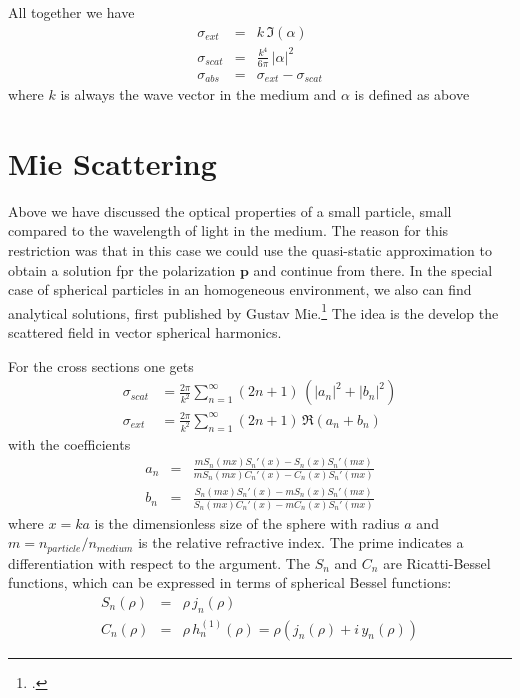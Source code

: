All together we have
\begin{eqnarray}
 \sigma_{ext} &= &  k \, \Im ( \alpha ) \\
 \sigma_{scat} & = &  \frac{k^4}{6 \pi }  \, |\alpha|^2 \\
 \sigma_{abs}  &=&  \sigma_{ext} - \sigma_{scat}
\end{eqnarray}
where $k$ is always the wave vector in the medium and $\alpha$ is defined as above

\section{Mie Scattering}

Above we have discussed the optical properties of a small particle, small compared to the wavelength of light in the medium. The reason for this restriction was that in this case we could use the quasi-static approximation to obtain a solution fpr the polarization $\mathbf{p}$ and continue from there. In the special case of spherical particles in an homogeneous environment, we also can find analytical solutions, first published by Gustav Mie.\footcite[chapter 4]{BH-book} The idea is the develop the scattered field in vector spherical harmonics.

For the cross sections one gets
\begin{eqnarray*}
\sigma_{scat} & = \frac{2 \pi }{k^2} \sum\limits_{n=1}^{\infty} (2 n+1) \, \left( |a_n|^2 + |b_n|^2 \right) \\
\sigma_{ext} & = \frac{2 \pi }{k^2} \sum\limits_{n=1}^{\infty} ( 2n+1)\, \Re \left( a_n + b_n \right) 
\end{eqnarray*}
%
with the coefficients
%
\begin{eqnarray*}
 a_n &= & \frac{m S_n (m x) S_n' (x) - S_n (x) S_n' (m x)}
 {m S_n (m x) C_n' (x) -  C_n (x) S_n' (m x)}  \\
 b_n &=  &\frac{S_n (m x) S_n' (x) - m S_n (x) S_n' (mx)}
  {S_n (mx) C_n' (x) - m C_n (x) S_n' (m x)} 
\end{eqnarray*}
where $x =k a $ is the dimensionless size of the sphere with radius $a$ and $m = n_{particle} / n_{medium}$ is the relative refractive index. The prime indicates a differentiation with respect to the argument. The $S_n$ and $C_n$ are Ricatti-Bessel functions, which can be expressed in terms of spherical Bessel functions:
\begin{eqnarray*}
S_n ( \rho) & =& \rho \, j_n (\rho) \\
C_n (\rho)  &= & \rho \, h_n^{(1)} (\rho)  = \rho \left(  j_n (\rho)  + i \,  y_n (\rho) \right)
\end{eqnarray*}

